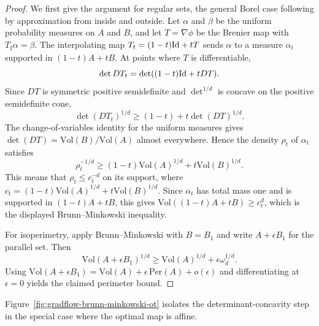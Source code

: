 \begin{proof}
	We first give the argument for regular sets, the general Borel case following by approximation from inside and outside. Let $\alpha$ and $\beta$ be the uniform probability measures on $A$ and $B$, and let $T=\nabla\phi$ be the Brenier map with $T_\sharp\alpha=\beta$. The interpolating map $T_t=(1-t)\mathrm{Id}+tT$ sends $\alpha$ to a measure $\alpha_t$ supported in $(1-t)A+tB$. At points where $T$ is differentiable,
	\[
		\det DT_t
		=
		\det((1-t)\mathrm{Id}+tDT).
	\]
	Since $DT$ is symmetric positive semidefinite and $\det^{1/d}$ is concave on the positive semidefinite cone,
	\[
		\det(DT_t)^{1/d}
		\geq
		(1-t)+t\det(DT)^{1/d}.
	\]
	The change-of-variables identity for the uniform measures gives $\det(DT)=\mathrm{Vol}(B)/\mathrm{Vol}(A)$ almost everywhere. Hence the density $\rho_t$ of $\alpha_t$ satisfies
	\[
		\rho_t^{-1/d}
		\geq
		(1-t)\mathrm{Vol}(A)^{1/d}
		+
		t\mathrm{Vol}(B)^{1/d}.
	\]
	This means that $\rho_t\leq c_t^{-d}$ on its support, where $c_t=(1-t)\mathrm{Vol}(A)^{1/d}+t\mathrm{Vol}(B)^{1/d}$. Since $\alpha_t$ has total mass one and is supported in $(1-t)A+tB$, this gives $\mathrm{Vol}((1-t)A+tB)\geq c_t^d$, which is the displayed Brunn--Minkowski inequality.

	For isoperimetry, apply Brunn--Minkowski with $B=B_1$ and write $A+\epsilon B_1$ for the parallel set. Then
	\[
		\mathrm{Vol}(A+\epsilon B_1)^{1/d}
		\geq
		\mathrm{Vol}(A)^{1/d}+\epsilon\omega_d^{1/d}.
	\]
	Using $\mathrm{Vol}(A+\epsilon B_1)=\mathrm{Vol}(A)+\epsilon\,\mathrm{Per}(A)+o(\epsilon)$ and differentiating at $\epsilon=0$ yields the claimed perimeter bound.
\end{proof}

Figure~\ref{fig:gradflow-brunn-minkowski-ot} isolates the determinant-concavity step in the special case where the optimal map is affine.


